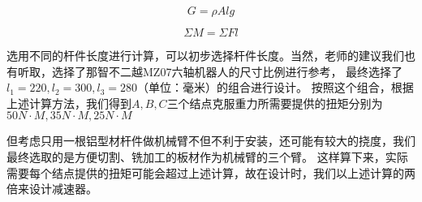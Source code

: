     \begin{equation}
        \label{eq:gravity}
        G= \rho Alg
    \end{equation}

    \begin{equation}
        \label{eq:static equilibrium}
        \Sigma M=\Sigma Fl
    \end{equation}

    选用不同的杆件长度进行计算，可以初步选择杆件长度。当然，老师的建议我们也有听取，选择了那智不二越MZ07六轴机器人的尺寸比例进行参考，
    最终选择了$l_1 = 220, l_2 = 300, l_3 = 280$（单位：毫米）的组合进行设计。
    按照这个组合，根据上述计算方法，我们得到$A,B,C$三个结点克服重力所需要提供的扭矩分别为$50 N\cdot M, 35 N\cdot M, 25 N\cdot M$

    但考虑只用一根铝型材杆件做机械臂不但不利于安装，还可能有较大的挠度，我们最终选取的是方便切割、铣加工的板材作为机械臂的三个臂。
    这样算下来，实际需要每个结点提供的扭矩可能会超过上述计算，故在设计时，我们以上述计算的两倍来设计减速器。